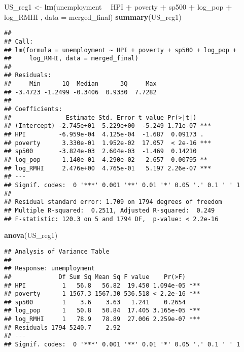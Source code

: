 \documentclass[
]{article}
\newenvironment{Shaded}{\begin{snugshade}}{\end{snugshade}}
\newcommand{\DataTypeTok}[1]{\textcolor[rgb]{0.13,0.29,0.53}{#1}}
\newcommand{\KeywordTok}[1]{\textcolor[rgb]{0.13,0.29,0.53}{\textbf{#1}}}
\newcommand{\NormalTok}[1]{#1}
\newcommand{\OperatorTok}[1]{\textcolor[rgb]{0.81,0.36,0.00}{\textbf{#1}}}
\newcommand{\StringTok}[1]{\textcolor[rgb]{0.31,0.60,0.02}{#1}}
\begin{document}
\begin{Shaded}
\begin{Highlighting}[]
\NormalTok{US_reg1 <-}\StringTok{ }\KeywordTok{lm}\NormalTok{(unemployment }\OperatorTok{~}\StringTok{ }\NormalTok{HPI }\OperatorTok{+}\StringTok{ }\NormalTok{poverty }\OperatorTok{+}\StringTok{ }\NormalTok{sp500 }\OperatorTok{+}\StringTok{ }\NormalTok{log_pop }\OperatorTok{+}\StringTok{ }\NormalTok{log_RMHI , }\DataTypeTok{data =}\NormalTok{ merged_final)}
\KeywordTok{summary}\NormalTok{(US_reg1)}
\end{Highlighting}
\end{Shaded}

\begin{verbatim}
## 
## Call:
## lm(formula = unemployment ~ HPI + poverty + sp500 + log_pop + 
##     log_RMHI, data = merged_final)
## 
## Residuals:
##     Min      1Q  Median      3Q     Max 
## -3.4723 -1.2499 -0.3406  0.9330  7.7282 
## 
## Coefficients:
##               Estimate Std. Error t value Pr(>|t|)    
## (Intercept) -2.745e+01  5.229e+00  -5.249 1.71e-07 ***
## HPI         -6.959e-04  4.125e-04  -1.687  0.09173 .  
## poverty      3.330e-01  1.952e-02  17.057  < 2e-16 ***
## sp500       -3.824e-03  2.604e-03  -1.469  0.14210    
## log_pop      1.140e-01  4.290e-02   2.657  0.00795 ** 
## log_RMHI     2.476e+00  4.765e-01   5.197 2.26e-07 ***
## ---
## Signif. codes:  0 '***' 0.001 '**' 0.01 '*' 0.05 '.' 0.1 ' ' 1
## 
## Residual standard error: 1.709 on 1794 degrees of freedom
## Multiple R-squared:  0.2511, Adjusted R-squared:  0.249 
## F-statistic: 120.3 on 5 and 1794 DF,  p-value: < 2.2e-16
\end{verbatim}

\begin{Shaded}
\begin{Highlighting}[]
\KeywordTok{anova}\NormalTok{(US_reg1)}
\end{Highlighting}
\end{Shaded}

\begin{verbatim}
## Analysis of Variance Table
## 
## Response: unemployment
##             Df Sum Sq Mean Sq F value    Pr(>F)    
## HPI          1   56.8   56.82  19.450 1.094e-05 ***
## poverty      1 1567.3 1567.30 536.518 < 2.2e-16 ***
## sp500        1    3.6    3.63   1.241    0.2654    
## log_pop      1   50.8   50.84  17.405 3.165e-05 ***
## log_RMHI     1   78.9   78.89  27.006 2.259e-07 ***
## Residuals 1794 5240.7    2.92                      
## ---
## Signif. codes:  0 '***' 0.001 '**' 0.01 '*' 0.05 '.' 0.1 ' ' 1
\end{verbatim}
\end{document}
